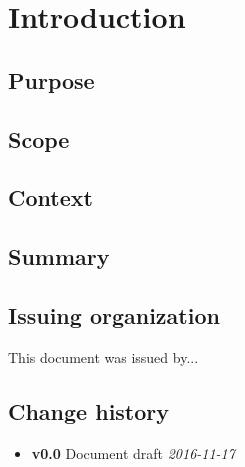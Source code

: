 \section{Introduction}

\subsection{Purpose}

\subsection{Scope}

\subsection{Context}

\subsection{Summary}

\subsection{Issuing organization}

This document was issued by...

\subsection{Change history}

\begin{itemize}
  \item \textbf{v0.0} Document draft \textit{2016-11-17}
\end{itemize}
